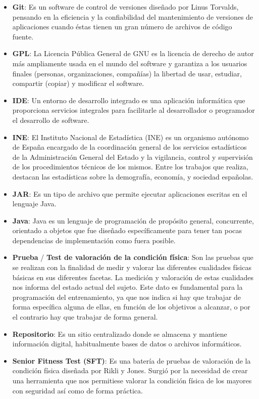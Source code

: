 \begin{itemize}
\item \textbf{Git}: Es un software de control de versiones diseñado por Linus Torvalds, pensando en la eficiencia y la confiabilidad del mantenimiento de versiones de aplicaciones cuando éstas tienen un gran número de archivos de código fuente.
\item \textbf{GPL}: La Licencia Pública General de GNU es la licencia de derecho de autor más ampliamente usada en el mundo del software y garantiza a los usuarios finales (personas, organizaciones, compañías) la libertad de usar, estudiar, compartir (copiar) y modificar el software.
\item \textbf{IDE}: Un entorno de desarrollo integrado es una aplicación informática que proporciona servicios integrales para facilitarle al desarrollador o programador el desarrollo de software.
\item \textbf{INE}: El Instituto Nacional de Estadística (INE) es un organismo autónomo de España encargado de la coordinación general de los servicios estadísticos de la Administración General del Estado y la vigilancia, control y supervisión de los procedimientos técnicos de los mismos. Entre los trabajos que realiza, destacan las estadísticas sobre la demografía, economía, y sociedad españolas.
\item \textbf{JAR}: Es un tipo de archivo que permite ejecutar aplicaciones escritas en el lenguaje Java.
\item \textbf{Java}: Java es un lenguaje de programación de propósito general, concurrente, orientado a objetos que fue diseñado específicamente para tener tan pocas dependencias de implementación como fuera posible.
\item \textbf{Prueba} /  \textbf{ Test de valoración de la condición física}: Son las pruebas que se realizan con la finalidad de medir y valorar las diferentes cualidades físicas básicas en sus diferentes facetas. La medición y valoración de estas cualidades nos informa del estado actual del sujeto. Este dato es fundamental para la programación del entrenamiento, ya que nos indica si hay que trabajar de forma específica alguna de ellas, en función de los objetivos a alcanzar, o por el contrario hay que trabajar de forma general.
\item \textbf{Repositorio}: Es un sitio centralizado donde se almacena y mantiene información digital, habitualmente bases de datos o archivos informáticos.
\item \textbf{Senior Fitness Test (SFT)}: Es una batería de pruebas de valoración de la condición física diseñada por Rikli y Jones. Surgió por la necesidad de crear una herramienta que nos permitiese valorar la condición física de los mayores con seguridad así como de forma práctica.

\end{itemize}
